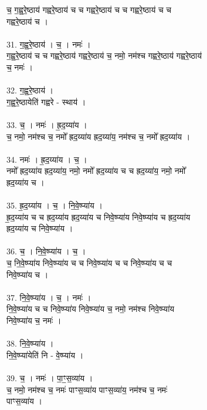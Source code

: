 च॒ ग॒ह्व॒रे॒ष्ठाय॑ गह्वरे॒ष्ठाय॑ च च गह्वरे॒ष्ठाय॑ च च गह्वरे॒ष्ठाय॑ च च\\
गह्वरे॒ष्ठाय॑ च ।\\
\\
31. ग॒ह्व॒रे॒ष्ठाय॑ । च॒ । नमः॑ ।\\
ग॒ह्व॒रे॒ष्ठाय॑ च च गह्वरे॒ष्ठाय॑ गह्वरे॒ष्ठाय॑ च॒ नमो॒ नम॑श्च गह्वरे॒ष्ठाय॑ गह्वरे॒ष्ठाय॑\\
च॒ नमः॑ ।\\
\\
32. ग॒ह्व॒रे॒ष्ठाय॑ ।\\
ग॒ह्व॒रे॒ष्ठायेति॑ गह्वरे - स्थाय॑ ।\\
\\
33. च॒ । नमः॑ । ह्र॒द॒य्या॑य ।\\
च॒ नमो॒ नम॑श्च च॒ नमो᳚ ह्रद॒य्या॑य ह्रद॒य्या॑य॒ नम॑श्च च॒ नमो᳚ ह्रद॒य्या॑य ।\\
\\
34. नमः॑ । ह्र॒द॒य्या॑य । च॒ ।\\
नमो᳚ ह्रद॒य्या॑य ह्रद॒य्या॑य॒ नमो॒ नमो᳚ ह्रद॒य्या॑य च च ह्रद॒य्या॑य॒ नमो॒ नमो᳚\\
ह्रद॒य्या॑य च ।\\
\\
35. ह्र॒द॒य्या॑य । च॒ । नि॒वे॒ष्प्या॑य ।\\
ह्र॒द॒य्या॑य च च ह्रद॒य्या॑य ह्रद॒य्या॑य च निवे॒ष्प्या॑य निवे॒ष्प्या॑य च ह्रद॒य्या॑य\\
ह्रद॒य्या॑य च निवे॒ष्प्या॑य ।\\
\\
36. च॒ । नि॒वे॒ष्प्या॑य । च॒ ।\\
च॒ नि॒वे॒ष्प्या॑य निवे॒ष्प्या॑य च च निवे॒ष्प्या॑य च च निवे॒ष्प्या॑य च च\\
निवे॒ष्प्या॑य च ।\\
\\
37. नि॒वे॒ष्प्या॑य । च॒ । नमः॑ ।\\
नि॒वे॒ष्प्या॑य च च निवे॒ष्प्या॑य निवे॒ष्प्या॑य च॒ नमो॒ नम॑श्च निवे॒ष्प्या॑य\\
निवे॒ष्प्या॑य च॒ नमः॑ ।\\
\\
38. नि॒वे॒ष्प्या॑य ।\\
नि॒वे॒ष्प्या॑येति॑ नि - वे॒ष्प्या॑य ।\\
\\
39. च॒ । नमः॑ । पा॒ꣳ॒स॒व्या॑य ।\\
च॒ नमो॒ नम॑श्च च॒ नमः॑ पाꣳस॒व्या॑य पाꣳस॒व्या॑य॒ नम॑श्च च॒ नमः॑\\
पाꣳस॒व्या॑य ।\\
\\
